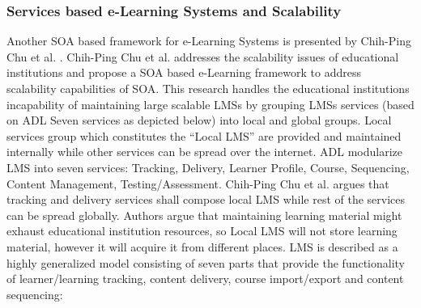 \documentclass[12pt,a4paper,final,twoside,onecolumn,titlepage]{book}
\begin{document}
\subsubsection{Services based e-Learning Systems and Scalability}
Another \gls{SOA} based framework for e-Learning Systems is presented by Chih-Ping Chu et al. \cite{R61}. Chih-Ping Chu et al. addresses the scalability issues of educational institutions and propose a \gls{SOA} based e-Learning framework to address scalability capabilities of \gls{SOA}. This research handles the educational institutions incapability of maintaining large scalable \gls{LMS}s by grouping \gls{LMS}s services (based on \gls{ADL} Seven services as depicted below) into local and global groups. Local services group which constitutes the “Local \gls{LMS}” are provided and maintained internally while other services can be spread over the internet. \gls{ADL}  modularize \gls{LMS} into seven services: Tracking, Delivery, Learner Profile, Course, Sequencing, Content Management, Testing/Assessment. Chih-Ping Chu et al. argues that tracking and delivery services shall compose local \gls{LMS} while rest of the services can be spread globally. Authors argue that maintaining learning material might exhaust educational institution resources, so Local \gls{LMS} will not store learning material, however it will acquire it from different places.
\gls{LMS} is described as a highly generalized model consisting of seven parts that provide the functionality of learner/learning tracking, content delivery, course import/export and content sequencing:
\end{document}
